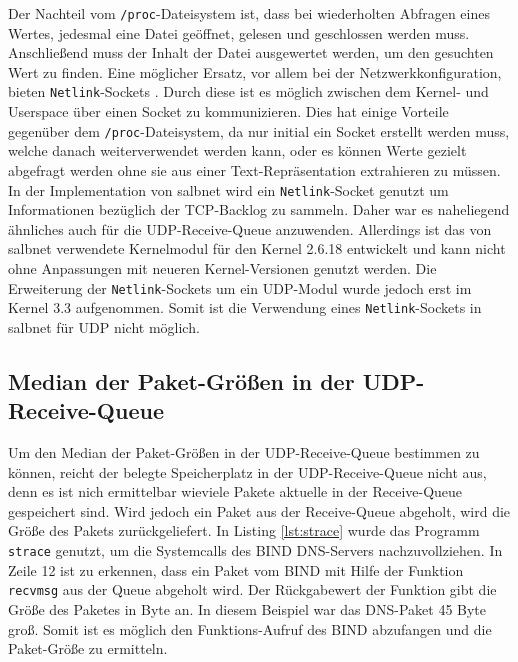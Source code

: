 \documentclass[a4paper, 12pt, BCOR10mm, DIV12, toc=bibliography, toc=listof, german]{scrbook}
\begin{document}
		Der Nachteil vom \texttt{/proc}-Dateisystem ist, dass bei wiederholten Abfragen eines Wertes,
		jedesmal eine Datei geöffnet, gelesen und geschlossen werden muss. Anschließend muss der Inhalt
		der Datei ausgewertet werden, um den gesuchten Wert zu finden. Eine möglicher Ersatz, vor allem
		bei der Netzwerkkonfiguration, bieten \texttt{Netlink}-Sockets \cite{rfc3549, gusowski2009}.
		Durch diese ist es möglich zwischen dem Kernel- und Userspace über einen Socket zu
		kommunizieren. Dies hat einige Vorteile gegenüber dem \texttt{/proc}-Dateisystem, da nur initial
		ein Socket erstellt werden muss, welche danach weiterverwendet werden kann, oder es können Werte
		gezielt abgefragt werden ohne sie aus einer Text-Repräsentation extrahieren zu müssen. In der
		Implementation von salbnet \cite{zinke2012,salbnet} wird ein \texttt{Netlink}-Socket genutzt um
		Informationen bezüglich der TCP-Backlog zu sammeln. Daher war es naheliegend ähnliches auch für
		die UDP-Receive-Queue anzuwenden. Allerdings ist das von salbnet verwendete Kernelmodul für den
		Kernel 2.6.18 entwickelt und kann nicht ohne Anpassungen mit neueren Kernel-Versionen genutzt
		werden. Die Erweiterung der \texttt{Netlink}-Sockets um ein UDP-Modul wurde jedoch erst im
		Kernel 3.3\cite{udpnetlink} aufgenommen. Somit ist die Verwendung eines \texttt{Netlink}-Sockets
		in salbnet für UDP nicht möglich.

		


		\subsection*{Median der Paket-Größen in der UDP-Receive-Queue} %

		Um den Median der Paket-Größen in der UDP-Receive-Queue bestimmen zu können, reicht der belegte
		Speicherplatz in der UDP-Receive-Queue nicht aus, denn es ist nich ermittelbar wieviele Pakete
		aktuelle in der Receive-Queue gespeichert sind. Wird jedoch ein Paket aus der Receive-Queue
		abgeholt, wird die Größe des Pakets zurückgeliefert. In Listing \ref{lst:strace} wurde das
		Programm \texttt{strace} genutzt, um die Systemcalls des BIND DNS-Servers nachzuvollziehen. In
		Zeile 12 ist zu erkennen, dass ein Paket vom BIND mit Hilfe der Funktion \texttt{recvmsg} aus
		der Queue abgeholt wird. Der Rückgabewert der Funktion gibt die Größe des Paketes in Byte an. In
		diesem Beispiel war das DNS-Paket 45 Byte groß. Somit ist es möglich den Funktions-Aufruf des
		BIND abzufangen und die Paket-Größe zu ermitteln.
\end{document}
